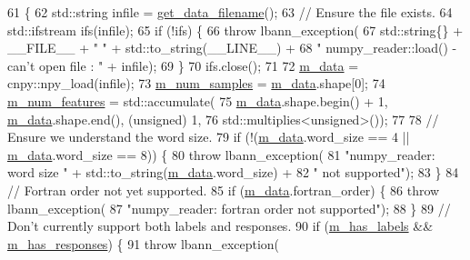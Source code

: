 \begin{DoxyCode}
61                         \{
62   std::string infile = \hyperlink{classlbann_1_1generic__data__reader_a56664e1b43f3fe923cf6d652f14b40a9}{get\_data\_filename}();
63   \textcolor{comment}{// Ensure the file exists.}
64   std::ifstream ifs(infile);
65   \textcolor{keywordflow}{if} (!ifs) \{
66     \textcolor{keywordflow}{throw} lbann\_exception(
67       std::string\{\} + \_\_FILE\_\_ + \textcolor{stringliteral}{" "} + std::to\_string(\_\_LINE\_\_) +
68       \textcolor{stringliteral}{" numpy\_reader::load() - can't open file : "} + infile);
69   \}
70   ifs.close();
71 
72   \hyperlink{classlbann_1_1numpy__reader_a6d43a1eae0fedb6fa237b24cef8f37fa}{m\_data} = cnpy::npy\_load(infile);
73   \hyperlink{classlbann_1_1numpy__reader_a5e0d81c07c950a2d81645566a2ccd965}{m\_num\_samples} = \hyperlink{classlbann_1_1numpy__reader_a6d43a1eae0fedb6fa237b24cef8f37fa}{m\_data}.shape[0];
74   \hyperlink{classlbann_1_1numpy__reader_aef25f95077f565fa9616ec353b93f675}{m\_num\_features} = std::accumulate(
75     \hyperlink{classlbann_1_1numpy__reader_a6d43a1eae0fedb6fa237b24cef8f37fa}{m\_data}.shape.begin() + 1, \hyperlink{classlbann_1_1numpy__reader_a6d43a1eae0fedb6fa237b24cef8f37fa}{m\_data}.shape.end(), (unsigned) 1,
76     std::multiplies<unsigned>());
77 
78   \textcolor{comment}{// Ensure we understand the word size.}
79   \textcolor{keywordflow}{if} (!(\hyperlink{classlbann_1_1numpy__reader_a6d43a1eae0fedb6fa237b24cef8f37fa}{m\_data}.word\_size == 4 || \hyperlink{classlbann_1_1numpy__reader_a6d43a1eae0fedb6fa237b24cef8f37fa}{m\_data}.word\_size == 8)) \{
80     \textcolor{keywordflow}{throw} lbann\_exception(
81       \textcolor{stringliteral}{"numpy\_reader: word size "} + std::to\_string(\hyperlink{classlbann_1_1numpy__reader_a6d43a1eae0fedb6fa237b24cef8f37fa}{m\_data}.word\_size) +
82       \textcolor{stringliteral}{" not supported"});
83   \}
84   \textcolor{comment}{// Fortran order not yet supported.}
85   \textcolor{keywordflow}{if} (\hyperlink{classlbann_1_1numpy__reader_a6d43a1eae0fedb6fa237b24cef8f37fa}{m\_data}.fortran\_order) \{
86     \textcolor{keywordflow}{throw} lbann\_exception(
87       \textcolor{stringliteral}{"numpy\_reader: fortran order not supported"});
88   \}
89   \textcolor{comment}{// Don't currently support both labels and responses.}
90   \textcolor{keywordflow}{if} (\hyperlink{classlbann_1_1numpy__reader_a0e8caa5609e706bf909b78c4c35377b8}{m\_has\_labels} && \hyperlink{classlbann_1_1numpy__reader_a7567338be86dff81afece19d031a942d}{m\_has\_responses}) \{
91     \textcolor{keywordflow}{throw} lbann\_exception(

\end{DoxyCode}
